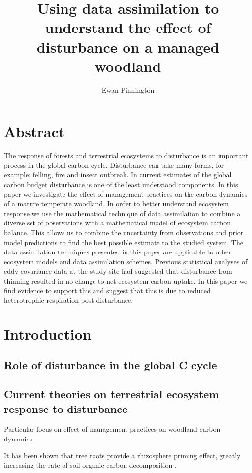 \documentclass[11pt]{article}
\title{Using data assimilation to understand the effect of disturbance on a managed woodland}
\author{Ewan Pinnington}
\begin{document}
\maketitle


\section*{Abstract}
The response of forests and terrestrial ecosystems to disturbance is an important process in the global carbon cycle. Disturbance can take many forms, for example; felling, fire and insect outbreak. In current estimates of the global carbon budget disturbance is one of the least understood components. In this paper we investigate the effect of management practices on the carbon dynamics of a mature temperate woodland. In order to better understand ecosystem response we use the mathematical technique of data assimilation to combine a diverse set of observations with a mathematical model of ecosystem carbon balance. This allows us to combine the uncertainty from observations and prior model predictions to find the best possible estimate to the studied system. The data assimilation techniques presented in this paper are applicable to other ecosystem models and data assimilation schemes. Previous statistical analyses of eddy covariance data at the study site had suggested that disturbance from thinning resulted in no change to net ecosystem carbon uptake. In this paper we find evidence to support this and suggest that this is due to reduced heterotrophic respiration post-disturbance.  

\section{Introduction}
\subsection{Role of disturbance in the global C cycle}

\subsection{Current theories on terrestrial ecosystem response to disturbance}
Particular focus on effect of management practices on woodland carbon dynamics.


It has been shown that tree roots provide a rhizosphere priming effect, greatly increasing the rate of soil organic carbon decomposition \citep{ELE:ELE1095}.
\end{document}
